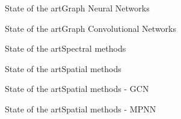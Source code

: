 \documentclass[xcolor=table]{beamer}
\begin{document}
\begin{frame}{State of the art}{Graph Neural Networks}







\end{frame}




\begin{frame}{State of the art}{Graph Convolutional Networks}




\end{frame}



\begin{frame}{State of the art}{Spectral methods}



\end{frame}


\begin{frame}{State of the art}{Spatial methods}
\end{frame}


\begin{frame}{State of the art}{Spatial methods - GCN}


\end{frame}


\begin{frame}{State of the art}{Spatial methods - MPNN}


\end{frame}
\end{document}
